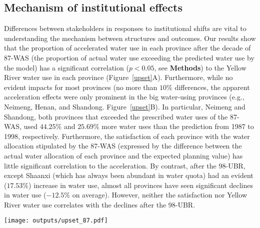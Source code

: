 
\subsection{Mechanism of institutional effects}
\label{result-2}

Differences between stakeholders in responses to institutional shifts are vital to understanding the mechanism between structures and outcomes.
Our results show that the proportion of accelerated water use in each province after the decade of 87-WAS (the proportion of actual water use exceeding the predicted water use by the model) has a significant correlation ($p<0.05$, see \textbf{Methods}) to the Yellow River water use in each province (Figure~\ref{upset}A).
Furthermore, while no evident impacts for most provinces (no more than $10\%$ differences, the apparent acceleration effects were only prominent in the big water-using provinces (e.g., Neimeng, Henan, and Shandong. Figure~\ref{upset}B).
In particular, Neimeng and Shandong, both provinces that exceeded the prescribed water uses of the 87-WAS, used $44.25\%$ and $25.69\%$ more water uses than the prediction from 1987 to 1998, respectively.
Furthermore, the satisfaction of each province with the water allocation stipulated by the 87-WAS (expressed by the difference between the actual water allocation of each province and the expected planning value) has little significant correlation to the acceleration.
By contrast, after the 98-UBR, except Shaanxi (which has always been abundant in water quota) had an evident ($17.53\%$) increase in water use, almost all provinces have seen significant declines in water use ($-12.5\%$ on average).
However, neither the satisfaction nor Yellow River water use correlates with the declines after the 98-UBR.

\begin{figure*}[!h]
    \centering
    \texttt{[image: outputs/upset\_87.pdf]}
    \caption{
        \textbf{A.} The partial correlation coefficient between wate uses (WU) of Yellow River (YR), unsatisfied ratio (compared with requirements in water plan and supply in the 87-WAS), and the average accelerated ratio.
        \textbf{B.} Average accelerated ratio of water uses for each province in the YRB during the decade after 87-WAS (from 1987 to 1998).
        \textbf{Mian users:} Major water consumption provinces (over the median).
        \textbf{Overused:} violate the 87-WAS in average water uses.
    }
    \label{upset}
\end{figure*}

